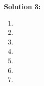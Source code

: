 \documentclass[]{article}
\begin{document}
\clearpage
\textbf{Solution 3:}
\begin{enumerate}[label=(\alph*)]
    \item %
    
    \item %
    
    \item %
    
    \item %
    
    \item %
    
    \item %
    
    \item %
    
\end{enumerate}

\clearpage
\end{document}
